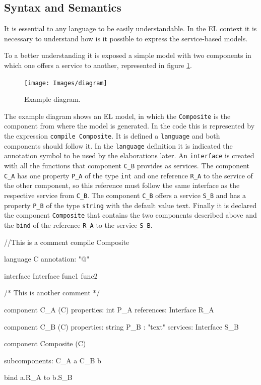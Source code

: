 \documentclass[11pt]{report}
\begin{document}
		\subsection{Syntax and Semantics}
		
		\par It is essential to any language to be easily understandable. In the EL context it is necessary to understand how is it possible to express the service-based models.
		\par To a better understanding it is exposed a simple model with two components in which one offers a service to another, represented in figure \ref{fig:example-diagram}.
		
		\begin{figure} [H]
			\centering
			\texttt{[image: Images/diagram]}
			\caption{Example diagram.}
			\label{fig:example-diagram}
		\end{figure}
		
		\par The example diagram shows an EL model, in which the \texttt{Composite} is the component from where the model is generated. In the code this is represented by the expression \texttt{compile Composite}. It is defined a \texttt{language} and both components should follow it. In the \texttt{language} definition it is indicated the annotation symbol to be used by the elaborations later. An \texttt{interface} is created with all the functions that component \texttt{C\_B} provides as services. The component \texttt{C\_A} has one property \texttt{P\_A} of the type \texttt{int} and one reference \texttt{R\_A} to the service of the other component, so this reference must follow the same interface as the respective service from \texttt{C\_B}. The component \texttt{C\_B} offers a service \texttt{S\_B} and has a property \texttt{P\_B} of the type \texttt{string} with the default value text. Finally it is declared the component \texttt{Composite} that contains the two components described above and the \texttt{bind} of the reference \texttt{R\_A} to the service \texttt{S\_B}.
		
		\begin{EL}
			//This is a comment
			compile Composite
			
			language C {
				annotation: "@"
			}
			
			interface Interface {
				func1 func2
			}
			
			/* 
			This is another comment 
			*/
			
			component C_A (C) {
				properties:
				int P_A
				references:
				Interface R_A
			}
			
			component C_B (C) {
				properties:
				string P_B : "text"
				services:
				Interface S_B
			}
			
			component Composite (C) {
				subcomponents:
				C_A a
				C_B b
				
				bind a.R_A to b.S_B
			}
		\end{EL} 			
\end{document}
